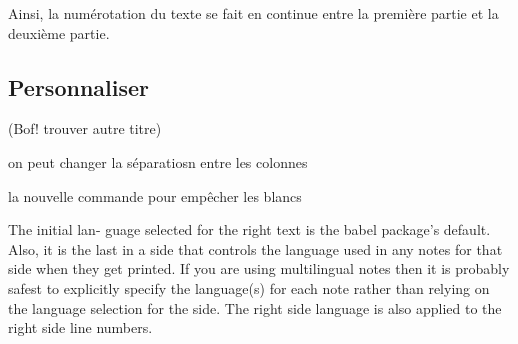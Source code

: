 Ainsi, la numérotation du texte se fait en continue entre la première partie et la deuxième partie.







\subsection{Personnaliser}


(Bof! trouver autre titre)



on peut changer la séparatiosn entre les colonnes

la nouvelle commande pour empêcher les blancs


The initial lan- guage selected for the right text is the babel package’s default. Also, it is the last \selectlanguage in a side that controls the language used in any notes for that
side when they get printed. If you are using multilingual notes then it is probably safest to explicitly specify the language(s) for each note rather than relying on the language selection for the side. The right side language is also applied to the right side line numbers.
